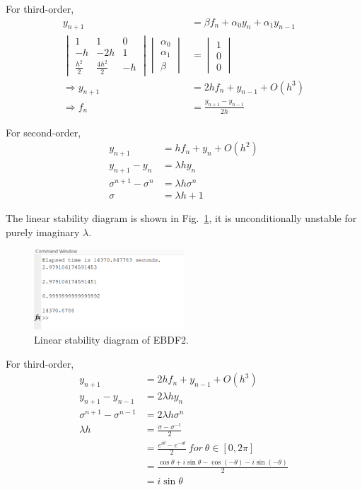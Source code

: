 \documentclass[letterpaper,10pt]{article}
\begin{document}
For third-order, 
\begin{align*}
  y_{n+1}&=\beta f_n+\alpha_0 y_n+\alpha_1 y_{n-1} \\
  \begin{vmatrix}
    1&1&0\\-h&-2h&1\\\frac{h^2}{2}&\frac{4h^2}{2}&-h
  \end{vmatrix}\begin{vmatrix}
    \alpha_0\\\alpha_1\\\beta
  \end{vmatrix}&=\begin{vmatrix}
    1\\0\\0
  \end{vmatrix}\\
  \Rightarrow y_{n+1}&=2h f_n +y_{n-1}+O(h^3)\\
  \Rightarrow f_n &= \frac{y_{n+1}-y_{n-1}}{2h}
\end{align*}

For second-order, 
\begin{align*}
  y_{n+1}&=h f_n +y_{n}+O(h^2)\\
  y_{n+1}-y_{n}&=\lambda h y_n\\
  \sigma^{n+1}-\sigma^{n}&=\lambda h \sigma^n\\
  \sigma&=\lambda h+1
\end{align*}

The linear stability diagram is shown in Fig.~\ref{fig3_2}, it is unconditionally unstable for purely imaginary $\lambda$. 
\begin{figure}[h]
  \centering
  \includegraphics[width=0.5\textwidth]{p3_2.png}
  \caption{Linear stability diagram of EBDF2. }
  \label{fig3_2}
\end{figure}

For third-order, 
\begin{align*}
  y_{n+1}&=2h f_n +y_{n-1}+O(h^3)\\
  y_{n+1}-y_{n-1}&=2\lambda h y_n\\
  \sigma^{n+1}-\sigma^{n-1}&=2\lambda h \sigma^n\\
  \lambda h &=\frac{\sigma-\sigma^{-1}}{2}\\
  &=\frac{e^{i\theta}-e^{-i\theta}}{2}~for~\theta\in[0,2\pi]\\
  &=\frac{\cos\theta+i\sin\theta-\cos(-\theta)-i\sin(-\theta)}{2}\\
  &=i\sin\theta
\end{align*}
\end{document}
